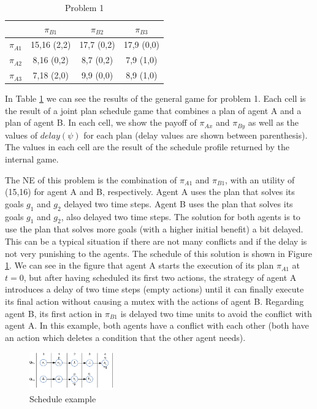 \documentclass[letterpaper]{article}
\begin{document}
\begin{table}[ht]
\centering \footnotesize
\begin{tabular}{|l|c|c|c|}
\hline

&  $\pi_{B1}$ & $\pi_{B2}$ &  $\pi_{B3}$ \\ \hline
$\pi_{A1}$ &  15,16 (2,2) &  17,7 (0,2)  & 17,9 (0,0) \\ \hline
$\pi_{A2}$  & 8,16 (0,2) & 8,7 (0,2) & 7,9 (1,0)\\ \hline
$\pi_{A3}$ &  7,18 (2,0)&  9,9 (0,0) & 8,9 (1,0) \\ \hline


\end{tabular}
\caption{Problem 1}
\label{tab:prob1}
\end{table}


In Table \ref{tab:prob1} we can see the results of the general game for problem 1. Each cell is the result of a joint plan schedule game that combines a plan of agent A and a plan of agent B. In each cell, we show the payoff of $\pi_{Ax}$ and $\pi_{By}$ as well as the values of $delay(\psi)$ for each plan (delay values are shown between parenthesis). The values in each cell are the result of the schedule profile returned by the internal game.

The NE of this problem is the combination of $\pi_{A1}$ and $\pi_{B1}$, with an utility of (15,16) for agent A and B, respectively. Agent A uses the plan that solves its goals $g_1$ and $g_2$ delayed two time steps. Agent B uses the plan that solves its goals $g_1$ and $g_2$, also delayed two time steps. The solution for both agents is to use the plan that solves more goals (with a higher initial benefit) a bit delayed. This can be a typical situation if there are not many conflicts and if the delay is not very punishing to the agents. The schedule of this solution is shown in Figure \ref{fig:schedule}. We can see in the figure that agent A starts the execution of its plan $\pi_{A1}$ at $t=0$, but after having scheduled its first two actions, the strategy of agent A introduces a delay of two time steps (empty actions) until it can finally execute its final action without causing a mutex with the actions of agent B. Regarding agent B, its first action in $\pi_{B1}$ is delayed two time units to avoid the conflict with agent A. In this example, both agents have a conflict with each other (both have an action which deletes a condition that the other agent needs).


\begin{figure}[ht]
\centering
\includegraphics[width=0.32\textwidth]{schedule}
\caption{Schedule example}
\label{fig:schedule}
\end{figure}
\end{document}
